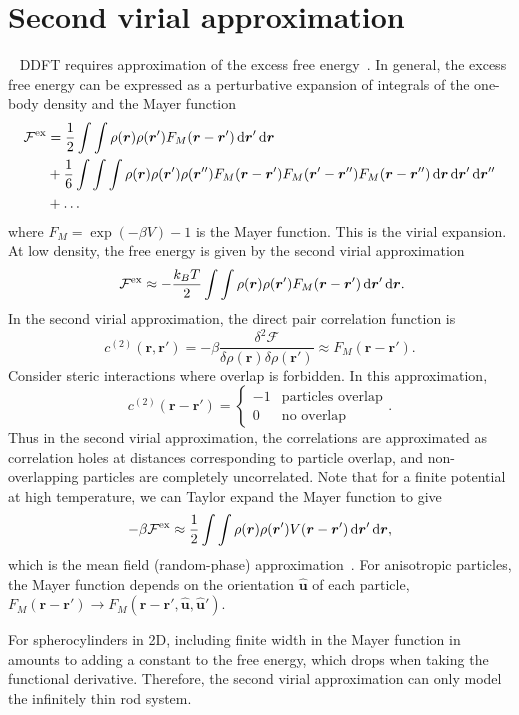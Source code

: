 \chapter{Second virial approximation}~\label{appx:2nd_virial}
DDFT requires approximation of the excess free energy~\cite{archer_dynamical_05}. 
In general, the excess free energy can be expressed as a perturbative expansion
of integrals of the one-body density and the Mayer
function~\cite{hansen_theory_06}
%
\begin{align}
  \mathcal{F}^{\mathrm{ex}} &= \frac{1}{2} \int \int \rho( \bm{r} ) \rho( \bm{r}') 
  F_M( \bm{r} -\bm{r}' ) \mathop{}\!\mathrm{d} \bm{r}' \mathop{}\!\mathrm{d} \bm{r} \\
    &+ \frac{1}{6} \int \int \int 
    \rho( \bm{r} ) \rho( \bm{r}') \rho( \bm{r}'')
    F_M( \bm{r} -\bm{r}' ) F_M( \bm{r}' -\bm{r}'' ) F_M( \bm{r} -\bm{r}'' ) 
    \mathop{}\!\mathrm{d} \bm{r} \mathop{}\!\mathrm{d} \bm{r}' \mathop{}\!\mathrm{d} \bm{r}'' \\
   &+ \ldots
\end{align}
%
where $F_M = \exp( -\beta V ) - 1 $ is the Mayer function.  This is the virial expansion.  At low density, the free energy is given
by the second virial approximation
%
\begin{equation}~\label{eqn:2nd_virial}
  \mathcal{F}^{\mathrm{ex}} \approx -\frac{k_B T}{2} \int \int \rho( \bm{r} ) \rho( \bm{r}') 
  F_M( \bm{r} -\bm{r}' ) \mathop{}\!\mathrm{d} \bm{r}' \mathop{}\!\mathrm{d} \bm{r}.
\end{equation}
%
In the second virial approximation,  the direct pair correlation function is
%
\begin{equation}
  c^{(2)}(\bm{r},\bm{r}') = 
  -\beta \frac{\delta ^2 \mathcal{F}}{\delta \rho(\bm{r}) \delta \rho(\bm{r}')}
  \approx  F_M( \bm{r} -\bm{r}' ).
\end{equation}
%
Consider steric interactions where overlap is forbidden. In this
approximation, 
%
\begin{equation}
  c^{(2)}(\bm{r}-\bm{r}') = 
  \begin{cases}
    -1 & \text{particles overlap} \\
    0  & \text{no overlap}
  \end{cases}.
\end{equation}
%
Thus in the second virial approximation, the correlations are approximated as
correlation holes at distances corresponding to particle overlap, and
non-overlapping particles are completely uncorrelated.  Note that for a finite
potential at high
temperature, we can Taylor expand the Mayer function to give
%
\begin{equation}
  -\beta \mathcal{F}^{\mathrm{ex}} \approx \frac{1}{2} \int \int \rho( \bm{r} ) \rho( \bm{r}') 
  V( \bm{r} -\bm{r}' ) \mathop{}\!\mathrm{d} \bm{r}' \mathop{}\!\mathrm{d} \bm{r},
\end{equation}
%
which is the mean field (random-phase) approximation~\cite{hansen_theory_06}.
For anisotropic particles, the Mayer function depends on the orientation
$\bm{\hat{u}}$ of each particle, $F_M(\bm{r} -\bm{r}') \rightarrow F_M(\bm{r}
-\bm{r}', \bm{\hat{u}}, \bm{\hat{u}}')$.

For spherocylinders in 2D, including finite width in the Mayer function in
 amounts to adding a constant to the free energy, which 
drops when taking the functional derivative.  Therefore, the second virial
approximation can only model the infinitely thin rod system.
